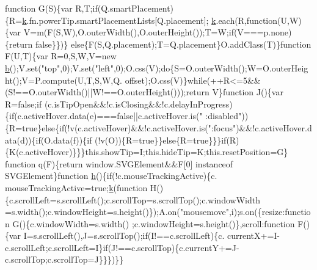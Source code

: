 \begin{DoxyCode}
{{      function} G(S)\{var R,T;\textcolor{keywordflow}{if}(Q.smartPlacement)\{R=\hyperlink{jquery_8js_ab26645c014aa005ecedef329ecf58c99}{k}.fn.powerTip.smartPlacementLists[Q.placement];
      \hyperlink{jquery_8js_ab26645c014aa005ecedef329ecf58c99}{k}.each(R,\textcolor{keyword}{function}(U,W)\{var V=m(F(S,W),O.outerWidth(),O.outerHeight());T=W;\textcolor{keywordflow}{if}(V===p.none)\{\textcolor{keywordflow}{return} \textcolor{keyword}{false}\}\})\}\textcolor{keywordflow}{
      else}\{F(S,Q.placement);T=Q.placement\}O.addClass(T)\}\textcolor{keyword}{function} F(U,T)\{var R=0,S,W,V=\textcolor{keyword}{new} 
      \hyperlink{jquery_8js_aa4026ad5544b958e54ce5e106fa1c805}{b}();V.set(\textcolor{stringliteral}{"top"},0);V.set(\textcolor{stringliteral}{"left"},0);O.css(V);\textcolor{keywordflow}{do}\{S=O.outerWidth();W=O.outerHeight();V=P.compute(U,T,S,W,Q.
      offset);O.css(V)\}\textcolor{keywordflow}{while}(++R<=5&&(S!==O.outerWidth()||W!==O.outerHeight()));\textcolor{keywordflow}{return} V\}\textcolor{keyword}{function} J()\{var R=\textcolor{keyword}{false};\textcolor{keywordflow}{if}
      (c.isTipOpen&&!c.isClosing&&!c.delayInProgress)\{\textcolor{keywordflow}{if}(c.activeHover.data(e)===\textcolor{keyword}{false}||c.activeHover.is(\textcolor{stringliteral}{"
      :disabled"}))\{R=\textcolor{keyword}{true}\}\textcolor{keywordflow}{else}\{\textcolor{keywordflow}{if}(!v(c.activeHover)&&!c.activeHover.is(\textcolor{stringliteral}{":focus"})&&!c.activeHover.data(d))\{\textcolor{keywordflow}{if}(O.data(f))\{\textcolor{keywordflow}{if}
      (!v(O))\{R=\textcolor{keyword}{true}\}\}\textcolor{keywordflow}{else}\{R=\textcolor{keyword}{true}\}\}\}\textcolor{keywordflow}{if}(R)\{K(c.activeHover)\}\}\}this.showTip=I;this.hideTip=K;this.resetPosition=G\}\textcolor{keyword}{
      function} q(F)\{\textcolor{keywordflow}{return} window.SVGElement&&F[0] instanceof SVGElement\}\textcolor{keyword}{function} \hyperlink{all__1a_8js_aebecdaf2444e2be39f4804412d6a3bf8}{h}()\{\textcolor{keywordflow}{if}(!c.mouseTrackingActive)\{c.
      mouseTrackingActive=\textcolor{keyword}{true};\hyperlink{jquery_8js_ab26645c014aa005ecedef329ecf58c99}{k}(\textcolor{keyword}{function} H()\{c.scrollLeft=s.scrollLeft();c.scrollTop=s.scrollTop();c.windowWidth
      =s.width();c.windowHeight=s.height()\});A.on(\textcolor{stringliteral}{"mousemove"},i);s.on(\{resize:\textcolor{keyword}{function} G()\{c.windowWidth=s.width()
      ;c.windowHeight=s.height()\},scroll:\textcolor{keyword}{function} F()\{var I=s.scrollLeft(),J=s.scrollTop();\textcolor{keywordflow}{if}(I!==c.scrollLeft)\{c.
      currentX+=I-c.scrollLeft;c.scrollLeft=I\}\textcolor{keywordflow}{if}(J!==c.scrollTop)\{c.currentY+=J-c.scrollTop;c.scrollTop=J\}\}\})\}\}\textcolor{keyword}{
}}
\end{DoxyCode}
